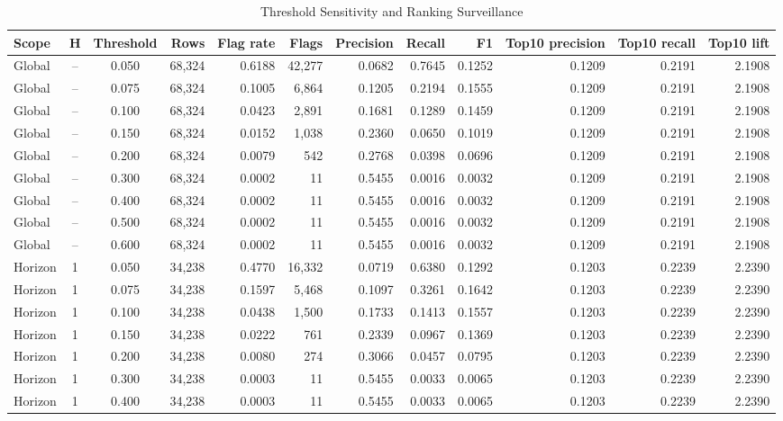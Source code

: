 \documentclass{ieeeaccess}
\begin{document}
\begin{table}[t]
\caption{Threshold Sensitivity and Ranking Surveillance}
\label{tab:threshold}
\centering
\scriptsize
\begin{tabularx}{\textwidth}{l c c r r r r r r r r r}
\toprule
Scope & H & Threshold & Rows & Flag rate & Flags & Precision & Recall & F1 & Top10 precision & Top10 recall & Top10 lift \\
\midrule
Global & -- & 0.050 & 68,324 & 0.6188 & 42,277 & 0.0682 & 0.7645 & 0.1252 & 0.1209 & 0.2191 & 2.1908 \\
Global & -- & 0.075 & 68,324 & 0.1005 & 6,864 & 0.1205 & 0.2194 & 0.1555 & 0.1209 & 0.2191 & 2.1908 \\
Global & -- & 0.100 & 68,324 & 0.0423 & 2,891 & 0.1681 & 0.1289 & 0.1459 & 0.1209 & 0.2191 & 2.1908 \\
Global & -- & 0.150 & 68,324 & 0.0152 & 1,038 & 0.2360 & 0.0650 & 0.1019 & 0.1209 & 0.2191 & 2.1908 \\
Global & -- & 0.200 & 68,324 & 0.0079 & 542 & 0.2768 & 0.0398 & 0.0696 & 0.1209 & 0.2191 & 2.1908 \\
Global & -- & 0.300 & 68,324 & 0.0002 & 11 & 0.5455 & 0.0016 & 0.0032 & 0.1209 & 0.2191 & 2.1908 \\
Global & -- & 0.400 & 68,324 & 0.0002 & 11 & 0.5455 & 0.0016 & 0.0032 & 0.1209 & 0.2191 & 2.1908 \\
Global & -- & 0.500 & 68,324 & 0.0002 & 11 & 0.5455 & 0.0016 & 0.0032 & 0.1209 & 0.2191 & 2.1908 \\
Global & -- & 0.600 & 68,324 & 0.0002 & 11 & 0.5455 & 0.0016 & 0.0032 & 0.1209 & 0.2191 & 2.1908 \\
Horizon & 1 & 0.050 & 34,238 & 0.4770 & 16,332 & 0.0719 & 0.6380 & 0.1292 & 0.1203 & 0.2239 & 2.2390 \\
Horizon & 1 & 0.075 & 34,238 & 0.1597 & 5,468 & 0.1097 & 0.3261 & 0.1642 & 0.1203 & 0.2239 & 2.2390 \\
Horizon & 1 & 0.100 & 34,238 & 0.0438 & 1,500 & 0.1733 & 0.1413 & 0.1557 & 0.1203 & 0.2239 & 2.2390 \\
Horizon & 1 & 0.150 & 34,238 & 0.0222 & 761 & 0.2339 & 0.0967 & 0.1369 & 0.1203 & 0.2239 & 2.2390 \\
Horizon & 1 & 0.200 & 34,238 & 0.0080 & 274 & 0.3066 & 0.0457 & 0.0795 & 0.1203 & 0.2239 & 2.2390 \\
Horizon & 1 & 0.300 & 34,238 & 0.0003 & 11 & 0.5455 & 0.0033 & 0.0065 & 0.1203 & 0.2239 & 2.2390 \\
Horizon & 1 & 0.400 & 34,238 & 0.0003 & 11 & 0.5455 & 0.0033 & 0.0065 & 0.1203 & 0.2239 & 2.2390 \\

\end{tabularx}
\end{table}
\end{document}
